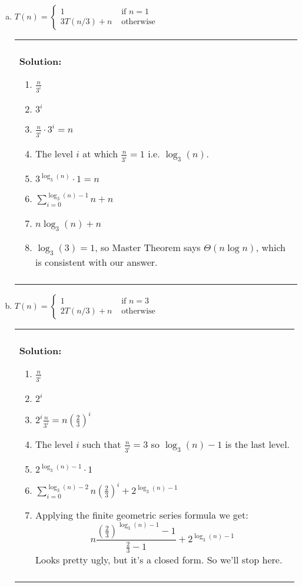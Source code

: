 \documentclass[12pt]{article}
\newenvironment{solution}
	{\begin{center}
	\begin{tabular}{|p{0.9\textwidth}|}
	\hline\\
	\textbf{Solution:}
	}
	{\\\\
	\hline
	\end{tabular}
	\end{center}
	}
\begin{document}
\begin{enumerate}[a)]
\begin{solution}
\begin{enumerate}[1.]
					\end{enumerate}
				\end{solution}
				\newpage
	\item $ T(n) = \begin{cases} 1 &\text{ if }n=1\\
					3T(n/3) + n &\text{ otherwise}
					\end{cases}$
				\begin{solution}
					\begin{enumerate}[1.]
						\item $\frac{n}{3^i}$
						\item $3^i$
						\item $\frac{n}{3^i} \cdot 3^i = n$
						\item The level $i$ at which $\frac{n}{3^i} = 1$ i.e. $\log_3(n)$. 
						\item $3^{\log_3(n)} \cdot 1 = n$
						\item $\sum\limits_{i=0}^{\log_3(n) - 1} n + n$ 
						\item $n\log_3(n) + n$
						\item $\log_3(3) = 1$, so Master Theorem says $\Theta(n \log n)$, which is consistent with our answer. 
					\end{enumerate}
				\end{solution}
				\newpage
	\item  $ T(n) = \begin{cases} 1 &\text{ if }n=3\\
					2T(n/3) + n &\text{ otherwise}
					\end{cases}$
					\begin{solution}
					\begin{enumerate}[1.]
						\item $\frac{n}{3^i}$
						\item $2^i$
						\item $2^i \frac{n}{3^i} = n\left(\frac{2}{3}\right)^i$
						\item The level $i$ such that $\frac{n}{3^i} = 3$ so $\log_3(n) - 1$ is the last level.
						\item $2^{\log_3(n) - 1} \cdot 1$
						\item $\sum\limits_{i=0}^{\log_3(n) - 2} n\left(\frac{2}{3}\right)^i + 2^{\log_3(n) - 1}$
						\item 
						Applying the finite geometric series formula we get:
						\[ n \frac{\left(\frac{2}{3}\right)^{\log_3(n) - 1 } - 1}{\frac{2}{3} - 1} +  2^{\log_3(n) - 1}\]
						Looks pretty ugly, but it's a closed form. So we'll stop here.

\end{enumerate}
\end{solution}
\end{enumerate}
\end{document}
